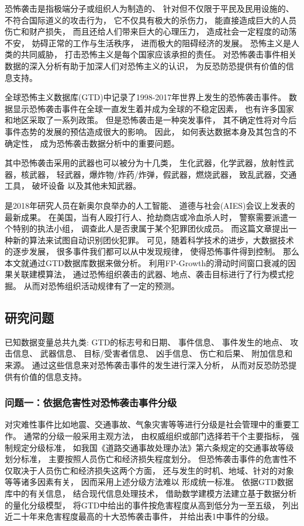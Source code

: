\documentclass[bwprint]{gmcmthesis}
\begin{document}
恐怖袭击是指极端分子或组织人为制造的、
针对但不仅限于平民\cite{Kaye2008More}及民用设施的、
不符合国际道义的攻击行为，
它不仅具有极大的杀伤力，
能直接造成巨大的人员伤亡和财产损失，
而且还给人们带来巨大的心理压力，
造成社会一定程度的动荡不安，
妨碍正常的工作与生活秩序，
进而极大的阻碍经济的发展。
恐怖主义是人类的共同威胁，
打击恐怖主义是每个国家应该承担的责任。
对恐怖袭击事件相关数据的深入分析有助于加深人们对恐怖主义的认识，
为反恐防恐提供有价值的信息支持。

全球恐怖主义数据库(GTD)中记录了1998-2017年世界上发生的恐怖袭击事件。
数据显示恐怖袭击事件在全球一直发生着并成为全球的不稳定因素，
也有许多国家和地区采取了一系列政策。
但是恐怖袭击是一种突发事件，
其不确定性将对今后事件态势的发展的预估造成很大的影响。
因此，
如何表达数据本身及其包含的不确定性，
成为恐怖袭击数据分析中的重要问题。

其中恐怖袭击采用的武器也可以被分为十几类，
生化武器，化学武器，放射性武器，核武器，
轻武器，爆炸物/炸药/炸弹，假武器，燃烧武器，
致乱武器，交通工具\cite{Lucci2006Civilian}，
破坏设备\cite{Ackerman2010WMD}
以及其他未知武器。

\cite{PGNN2018}是2018年研究人员在新奥尔良举办的人工智能、
道德与社会(AIES)会议上发表的最新成果。
在美国，当有人殴打行人、抢劫商店或冷血杀人时，
警察需要派遣一个特别的执法小组，
调查此人是否隶属于某个犯罪团伙成员。
而这篇文章提出一种新的算法来试图自动识别团伙犯罪。
可见，随着科学技术的进步，大数据技术的逐步发展，
很多事件我们都可以从中发现规律，
使得恐怖事件得到控制。
那么本文就通过GTD数据库数据来做分析。
\cite{王锂达2016挖掘恐怖组织行为模式}
利用FP-Growth的滑动时间窗口衰减的因果关联建模算法，
通过恐怖组织袭击的武器、地点、袭击目标进行了行为模式挖掘。
从而对恐怖组织活动规律有了一定的预测。

\subsection{研究问题}

已知数据变量总共九类:
GTD的标志号和日期、
事件信息、
事件发生的地点、
攻击信息、
武器信息、
目标/受害者信息、
凶手信息、
伤亡和后果、
附加信息和来源。
通过这些信息来对恐怖袭击事件的发生进行深入分析，
从而对反恐防恐提供有价值的信息支持。

\subsubsection{问题一：依据危害性对恐怖袭击事件分级}

对灾难性事件比如地震、交通事故、气象灾害等等进行分级是社会管理中的重要工作。
通常的分级一般采用主观方法，
由权威组织或部门选择若干个主要指标，
强制规定分级标准，
如我国《道路交通事故处理办法》第六条规定的交通事故等级划分标准，
主要按照人员伤亡和经济损失程度划分。
但恐怖袭击事件的危害性不仅取决于人员伤亡和经济损失这两个方面，
还与发生的时机、地域、针对的对象等等诸多因素有关，
因而采用上述分级方法难以
形成统一标准。
依据GTD数据库中的有关信息，
结合现代信息处理技术，
借助数学建模方法建立基于数据分析的量化分级模型，
将GTD中给出的事件按危害程度从高到低分为一至五级，
列出近二十年来危害程度最高的十大恐怖袭击事件，
并给出表1中事件的分级。
\end{document}
